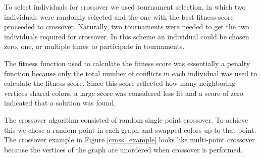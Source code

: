 \documentclass{article}
\begin{document}
	
	
	To select individuals for crossover we used tournament selection, in which two individuals were randomly selected and the one with the best fitness score  proceeded to crossover. Naturally, two tournaments were needed to get the two individuals required for crossover. In this scheme an individual could be chosen zero, one, or multiple times to participate in tournaments.
	
	The fitness function used to calculate the fitness score was essentially a penalty function because only the total number of conflicts in each individual was used to calculate the fitness score. Since this score reflected how many neighboring vertices shared colors, a large score was considered less fit and a score of zero indicated that a solution was found. 
	
	The crossover algorithm consisted of random single point crossover. To achieve this we chose a random point in each graph and swapped colors up to that point. The crossover example in Figure \ref{cross_example} looks like multi-point crossover because the vertices of the graph are unordered when crossover is performed.
	
	
	
	
	
\end{document}
